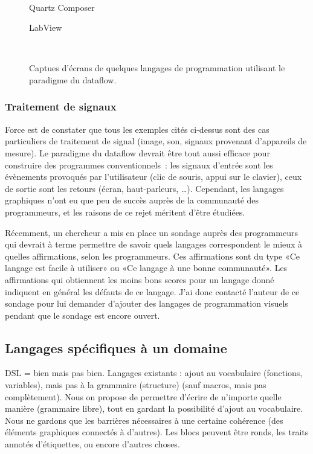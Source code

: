 \documentclass{article}
\begin{document}
\begin{figure}[ht]
  
  {\,}
  \hfill 
  \begin{minipage}{5cm}
    \centering
    \caption{Quartz Composer\cite{quartz-composer}}
    \label{fig:quartz-composer}
  \end{minipage}
  \hfill
  \begin{minipage}{5cm}
    \centering
    \caption{LabView\cite{labview}}
  \end{minipage}
  \hfill
  {\,} 
  \caption{Captues d'écrans de quelques langages de programmation utilisant le paradigme du dataflow.}
  \label{fig:screenshots}
\end{figure}

\subsubsection{Traitement de signaux}

Force est de constater que tous les exemples cités ci-dessus sont des cas particuliers de traitement de signal (image, son, signaux
provenant d'appareils de mesure). Le paradigme du dataflow devrait être tout aussi efficace pour construire des programmes conventionnels~:
les signaux d'entrée sont les évènements provoqués par l'utilisateur (clic de souris, appui sur le clavier), ceux de sortie sont les retours
(écran, haut-parleurs, \dots). Cependant, les langages graphiques n'ont eu que peu de succès auprès de la communauté des programmeurs, et
les raisons de ce rejet méritent d'être étudiées.

Récemment, un chercheur a mis en place un sondage auprès des programmeurs qui devrait à terme permettre de savoir quels langages
correspondent le mieux à quelles affirmations, selon les programmeurs\cite{the-right-tool}. Ces affirmations sont du type «Ce langage est facile à utiliser» ou
«Ce langage à une bonne communauté». Les affirmations qui obtiennent les moins bons scores pour un langage donné indiquent en général les
défauts de ce langage. J'ai donc contacté l'auteur de ce sondage pour lui demander d'ajouter des langages de programmation visuels pendant
que le sondage est encore ouvert.

\subsection{Langages spécifiques à un domaine}

DSL = bien mais pas bien. Langages existants : ajout au vocabulaire (fonctions, variables), mais pas à la grammaire (structure) (sauf
macros, mais pas complètement). Nous on propose de permettre d'écrire de n'importe quelle manière (grammaire libre), tout en gardant la
possibilité d'ajout au vocabulaire. Nous ne gardons que les barrières nécessaires à une certaine cohérence (des éléments graphiques
connectés à d'autres). Les blocs peuvent être ronds, les traits annotés d'étiquettes, ou encore d'autres choses.
\end{document}
